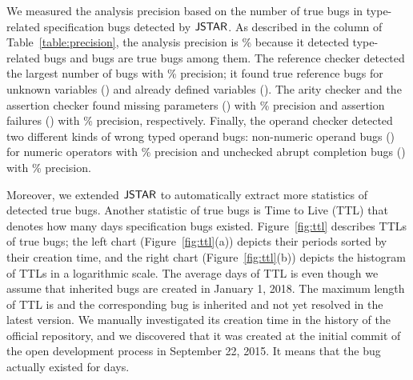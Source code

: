 We measured the analysis precision based on the number of true bugs in
type-related specification bugs detected by $\tool$.  As described in the
 column of Table~\ref{table:precision}, the analysis precision
is \% because it detected  type-related bugs and
 bugs are true bugs among them.  The reference checker detected the
largest number of bugs with \% precision; it found  true
reference bugs for  unknown variables () and
 already defined variables (). The arity
checker and the assertion checker found  missing parameters
() with \% precision and  assertion
failures () with \% precision, respectively.
Finally, the operand checker detected two different kinds of wrong typed operand
bugs:  non-numeric operand bugs () for numeric
operators with \% precision and  unchecked abrupt
completion bugs () with \% precision.

Moreover, we extended $\tool$ to automatically extract more statistics of
detected true bugs.    Another
statistic of true bugs is Time to Live (TTL) that denotes how many days
specification bugs existed.  Figure~\ref{fig:ttl} describes TTLs of true bugs;
the left chart (Figure~\ref{fig:ttl}(a)) depicts their periods sorted by their
creation time, and the right chart (Figure~\ref{fig:ttl}(b)) depicts the
histogram of TTLs in a logarithmic scale.  The average days of TTL is
 even though we assume that  inherited bugs are created
in January 1, 2018.  The maximum length of TTL is  and the
corresponding bug is inherited and not yet resolved in the latest version.  We
manually investigated its creation time in the history of the official
repository, and we discovered that it was created at the initial commit of the
open development process in September 22, 2015.  It means that the bug actually
existed for  days.


